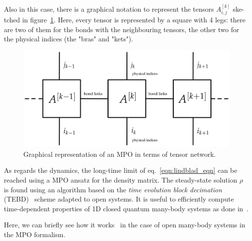 Also in this case, there is a graphical notation to represent the tensors $A^{[k]}_{i,j}$ ske-tched in figure~\ref{fig:mpo_graphical}. Here, every tensor is represented by a square with 4 legs: there are two of them for the bonds with the neighbouring tensors, the other two for the physical indices (the "bras" and "kets"). 

\begin{figure}[H]
    \centering
    \includegraphics[scale=0.4]{Figures/mpo_graphical.png}
    \captionsetup{width=1.\linewidth}
    \caption{Graphical representation of an MPO in terms of tensor network.}
    \label{fig:mpo_graphical}
\end{figure}

As regards the dynamics, the long-time limit of eq.~\ref{eqn:lindblad_eqn} can be reached using a MPO ansatz for the density matrix. The steady-state solution $\rho$ is found using an algorithm based on the \emph{time evolution block decimation} (TEBD)~\cite{PhysRevLett.91.147902} scheme adapted to open systems. It is useful to efficiently compute time-dependent properties of 1D closed quantum many-body systems as done in~\cite{PhysRevLett.93.040502}. 

Here, we can briefly see how it works~\cite{jin_biella_ross} in the case of open many-body systems in the MPO formalism. 

